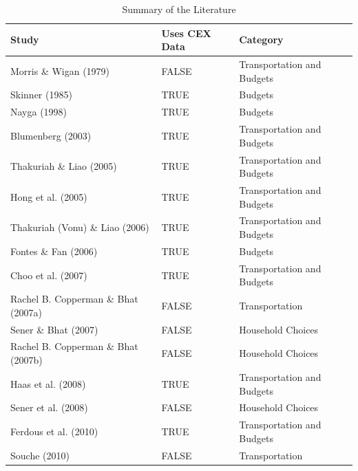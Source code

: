 \documentclass[
]{agujournal2019}
\begin{document}
{

\begin{longtable}[]{@{}
  >{\raggedright\arraybackslash}p{}
  >{\raggedright\arraybackslash}p{}
  >{\raggedright\arraybackslash}p{}@{}}

\caption{\label{tbl-lit-summary}Summary of the Literature}

\tabularnewline

\toprule\noalign{}
\begin{minipage}[b]{\linewidth}\raggedright
Study
\end{minipage} & \begin{minipage}[b]{\linewidth}\raggedright
Uses CEX Data
\end{minipage} & \begin{minipage}[b]{\linewidth}\raggedright
Category
\end{minipage} \\
\midrule\noalign{}
\endhead
\bottomrule\noalign{}
\endlastfoot
Morris \& Wigan (1979)
& FALSE & Transportation and Budgets \\
Skinner (1985)
& TRUE & Budgets \\
Nayga (1998)
& TRUE & Budgets \\
Blumenberg (2003)
& TRUE & Transportation and Budgets \\
Thakuriah \& Liao (2005)
& TRUE & Transportation and Budgets \\
Hong et al. (2005)
& TRUE & Transportation and Budgets \\
Thakuriah (Vonu) \& Liao (2006)
& TRUE & Transportation and Budgets \\
Fontes \& Fan (2006)
& TRUE & Budgets \\
Choo et al. (2007)
& TRUE & Transportation and Budgets \\
Rachel B. Copperman \& Bhat (2007a)
& FALSE & Transportation \\
Sener \& Bhat (2007)
& FALSE & Household Choices \\
Rachel B. Copperman \& Bhat (2007b)
& FALSE & Household Choices \\
Haas et al. (2008)
& TRUE & Transportation and Budgets \\
Sener et al. (2008)
& FALSE & Household Choices \\
Ferdous et al. (2010)
& TRUE & Transportation and Budgets \\
Souche (2010)
& FALSE & Transportation \\

\end{longtable}}
\end{document}
